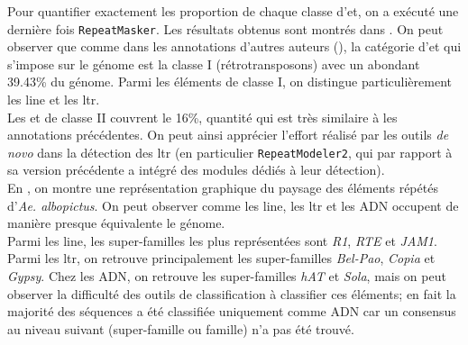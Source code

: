 \documentclass[10pt]{article}
\begin{document}
\bigskip

Pour quantifier exactement les proportion de chaque classe d'\acrshort{et}, on a exécuté une dernière fois \texttt{RepeatMasker}. Les résultats obtenus sont montrés dans \tableautorefname{ \ref{tab:rm_quantif}}. On peut observer que comme dans les annotations d'autres auteurs (\tableautorefname{ \ref{tab:annot_state_of_art}}), la catégorie d'\acrshort{et} qui s'impose sur le génome est la classe I (rétrotransposons) avec un abondant 39.43\% du génome. Parmi les éléments de classe I, on distingue particulièrement les \acrshort{line} et les \acrshort{ltr}. \\ 
Les \acrlong{et} de classe II couvrent le 16\%, quantité qui est très similaire à les annotations précédentes. On peut ainsi apprécier l'effort réalisé par les outils \textit{de novo} dans la détection des \acrshort{ltr} (en particulier \texttt{RepeatModeler2}, qui par rapport à sa version précédente a intégré des modules dédiés à leur détection). \\

En \figureautorefname{ \ref{fig:pie_chart}}, on montre une représentation graphique du paysage des éléments répétés d'\textit{Ae. albopictus}. On peut observer comme les \acrshort{line}, les \acrshort{ltr} et les ADN occupent de manière presque équivalente le génome. \\
Parmi les \acrshort{line}, les super-familles les plus représentées sont \textit{R1}, \textit{RTE} et \textit{JAM1}.  Parmi les \acrshort{ltr}, on retrouve principalement les super-familles \textit{Bel-Pao}, \textit{Copia} et \textit{Gypsy}. Chez les ADN, on retrouve les super-familles \textit{hAT} et \textit{Sola}, mais on peut observer la difficulté des outils de classification à classifier ces éléments; en fait la majorité des séquences a été classifiée uniquement comme ADN car un consensus au niveau suivant (super-famille ou famille) n'a pas été trouvé. \\

\bigskip
\end{document}

